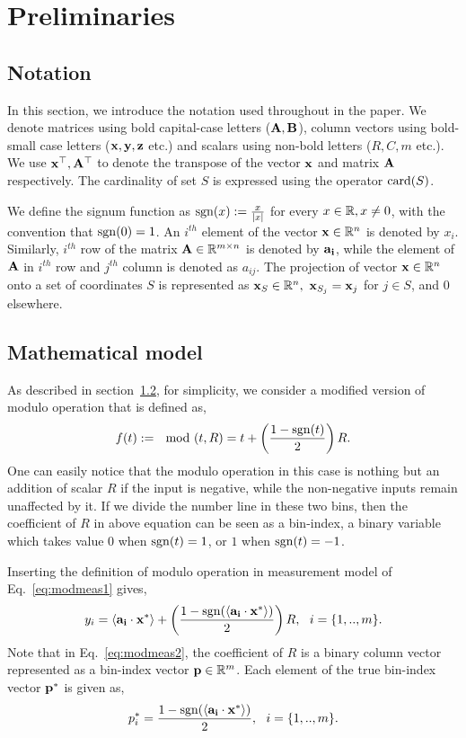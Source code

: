 \section{Preliminaries}
\label{sec:prelim}
\subsection{Notation}
\label{subsec:nota}
In this section, we introduce the notation used throughout in the paper. We denote matrices using bold capital-case letters ($\mathbf{A,B}$), column vectors using bold-small case letters ($\mathbf{x,y,z}$ etc.) and scalars using non-bold letters ($R,C,m$ etc.). We use $\mathbf{x}^\top,\mathbf{A}^\top$ to denote the transpose of the vector $\mathbf{x}$ and matrix $\mathbf{A}$ respectively. The cardinality of set $S$ is expressed using the operator $\mathrm{card}(S)$.

We define the signum function as $\mathrm{sgn}(x) := \frac{x}{|x|}$ for every $x \in {\mathbb{R}}, x \neq 0$, with the convention that $\mathrm{sgn}(0)=1$.
An $i^{th}$ element of the vector $\mathbf{x} \in {\mathbb{R}}^n$ is denoted by $x_{i}$. Similarly, $i^{th}$ row of the matrix $\mathbf{A} \in {\mathbb{R}}^{m \times n}$ is denoted by $\mathbf{a_i}$, while the element of $\mathbf{A}$ in $i^{th}$ row and $j^{th}$ column is denoted as $a_{ij}$. The projection of vector $\mathbf{x} \in {\mathbb{R}}^n$ onto a set of coordinates $S$ is represented as $\mathbf{x}_S \in {\mathbb{R}}^n,~\mathbf{x}_{S_j} = \mathbf{x}_j$ for $j \in S$, and $0$ elsewhere. 


\subsection{Mathematical model}
\label{subsec:model}
As described in section~\ref{subsec:model}, for simplicity, we consider a modified version of modulo operation that is defined as, 
$$
f(t) :=\mod(t,R) = t+\left( \frac{1-\mathrm{sgn}(t)}{2}\right)R.
$$
One can easily notice that the modulo operation in this case is nothing but an addition of scalar $R$ if the input is negative, while the non-negative inputs remain unaffected by it. If we divide the number line in these two bins, then the coefficient of $R$ in above equation can be seen as a bin-index, a binary variable which takes value $0$ when $\mathrm{sgn}(t)=1$, or $1$ when $\mathrm{sgn}(t)=-1$.

Inserting the definition of modulo operation in measurement model of Eq.~\ref{eq:modmeas1} gives,
\begin{equation}
y_i= \langle \mathbf{a_i} \cdot \mathbf{x^*} \rangle+\left( \frac{1-\sgn(\langle \mathbf{a_i} \cdot \mathbf{x^*} \rangle)}{2}\right)R,~~i = \{1,..,m\}.
\label{eq:modmeas2}
\end{equation} 
Note that in Eq.~\ref{eq:modmeas2}, the coefficient of $R$ is a binary column vector represented as a bin-index vector $\mathbf{p} \in {\mathbb{R}}^m$. Each element of the true bin-index vector $\mathbf{p}^*$ is given as,
$$
p^*_i = \frac{1-\mathrm{sgn}(\langle \mathbf{a_i} \cdot \mathbf{x^*} \rangle)}{2},~~i = \{1,..,m\}.
$$


